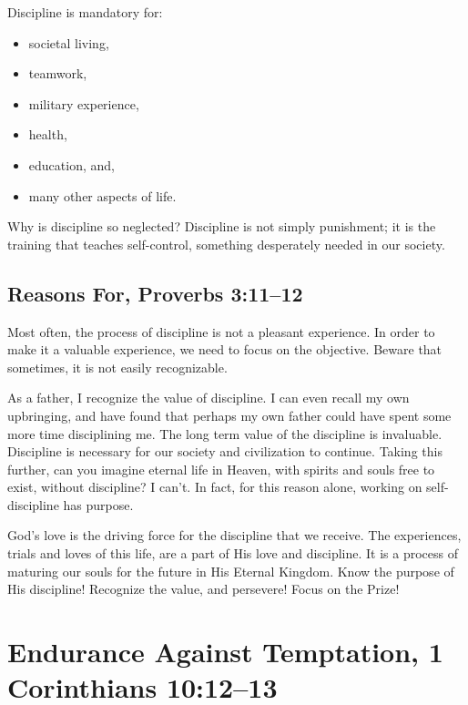 \documentclass[12pt]{memoir}
\begin{document}
Discipline is mandatory for: 

\begin{itemize}
\item societal living,
\item teamwork,
\item military experience,
\item health,
\item education, and,
\item many other aspects of life. 
\end{itemize}

Why is discipline so neglected? Discipline is not simply punishment; it is the training that teaches self-control, something desperately needed in our society.

\subsection[Reasons For]{Reasons For, Proverbs 3:11--12}

Most often, the process of discipline is not a pleasant experience.
In order to make it a valuable experience, we need to focus on the objective.
Beware that sometimes, it is not easily recognizable.

As a father, I recognize the value of discipline. I can even recall
my own upbringing, and have found that perhaps my own father could
have spent some more time disciplining me. The long term value of
the discipline is invaluable. Discipline is necessary for our society
and civilization to continue. Taking this further, can you imagine
eternal life in Heaven, with spirits and souls free to exist, without
discipline? I can't. In fact, for this reason alone, working on self-discipline
has purpose.

God's love is the driving force for the discipline that we receive.
The experiences, trials and loves of this life, are a part of His
love and discipline. It is a process of maturing our souls for the
future in His Eternal Kingdom. Know the purpose of His discipline!
Recognize the value, and persevere! Focus on the Prize!

\section[Endurance Against Temptation]{Endurance Against Temptation, 1 Corinthians 10:12--13}
\end{document}
